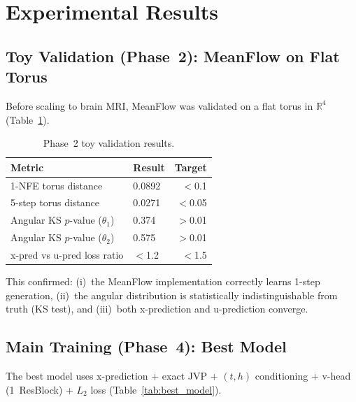\documentclass[11pt,a4paper]{article}
\begin{document}
\section{Experimental Results}
\label{sec:results}

\subsection{Toy Validation (Phase~2): MeanFlow on Flat Torus}

Before scaling to brain MRI, MeanFlow was validated on a flat torus in
$\mathbb{R}^4$ (Table~\ref{tab:torus}).

\begin{table}[ht]
\centering
\caption{Phase~2 toy validation results.}
\label{tab:torus}
\begin{tabular}{llr}
\toprule
\textbf{Metric} & \textbf{Result} & \textbf{Target} \\
\midrule
1-NFE torus distance            & 0.0892  & $<$0.1 \\
5-step torus distance           & 0.0271  & $<$0.05 \\
Angular KS $p$-value ($\theta_1$) & 0.374 & $>$0.01 \\
Angular KS $p$-value ($\theta_2$) & 0.575 & $>$0.01 \\
x-pred vs u-pred loss ratio     & $<$1.2  & $<$1.5 \\
\bottomrule
\end{tabular}
\end{table}

This confirmed: (i)~the MeanFlow implementation correctly learns 1-step
generation, (ii)~the angular distribution is statistically indistinguishable
from truth (KS test), and (iii)~both x-prediction and u-prediction converge.

\subsection{Main Training (Phase~4): Best Model}

The best model uses x-prediction + exact JVP + $(t,h)$ conditioning + v-head
(1~ResBlock) + $L_2$ loss (Table~\ref{tab:best_model}).
\end{document}
